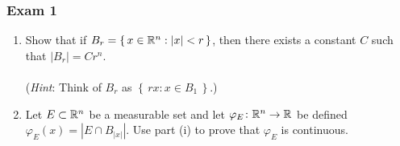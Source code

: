\subsubsection{Exam 1}
\setcounter{exercise}{0}
\setcounter{equation}{0}


\begin{problem}
\end{problem}
\begin{solution}
\end{solution}

\begin{problem}
\end{problem}
\begin{solution}
\end{solution}

\begin{problem}
\hfill
\begin{enumerate}[label=(\roman*),noitemsep]
\item Show that if $B_r=\left\{\, x \in\mathbb{R}^n:| x |<r\,\right\}$,
  then there exists a constant $C$ such that $|B_r|=Cr^n$.
\\\\
(\emph{Hint}: Think of $B_r$ as $\left\{\,r x : x \in B_1\,\right\}$.)
\item Let $E\subset\mathbb{R}^n$ be a measurable set and let
  $\varphi_E\colon\mathbb{R}^n\to\mathbb{R}$ be defined
  $\varphi_E( x )=\left|E\cap B_{| x |}\right|$. Use part (i) to prove
    that $\varphi_E$ is continuous.
\end{enumerate}
\end{problem}
